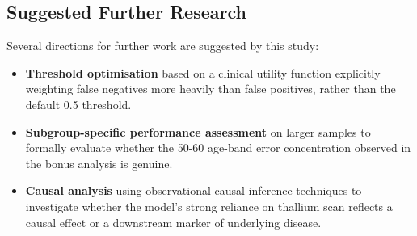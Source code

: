 \subsection{Suggested Further Research}

Several directions for further work are suggested by this study:

\begin{itemize}
    \item \textbf{Threshold optimisation} based on a clinical utility function explicitly weighting false negatives more heavily than false positives, rather than the default 0.5 threshold.
    \item \textbf{Subgroup-specific performance assessment} on larger samples to formally evaluate whether the 50-60 age-band error concentration observed in the bonus analysis is genuine.
    \item \textbf{Causal analysis} using observational causal inference techniques to investigate whether the model's strong reliance on thallium scan reflects a causal effect or a downstream marker of underlying disease.
\end{itemize}
